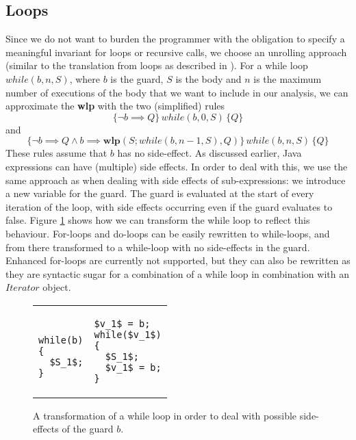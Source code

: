 \documentclass[a4paper, fleqn]{article}
\newcommand{\wlp}{\textbf{wlp}\xspace}
\begin{document}
\subsection{Loops}
Since we do not want to burden the programmer with the obligation to specify a meaningful invariant for loops or recursive calls, we choose an unrolling approach (similar to the translation from loops as described in \cite{guardedcommands}). For a while loop $while(b, n, S)$, where $b$ is the guard, $S$ is the body and $n$ is the maximum number of executions of the body that we want to include in our analysis, we can approximate the \wlp with the two (simplified) rules \[\{\neg b \implies Q\}\,while(b, 0, S)\, \{Q\}\] and \[\{\neg b \implies Q \land b \implies \wlp(S;while(b, n-1, S), Q)\}\,while(b, n, S)\, \{Q\}\] These rules assume that $b$ has no side-effect. As discussed earlier, Java expressions can have (multiple) side effects. In order to deal with this, we use the same approach as when dealing with side effects of sub-expressions: we introduce a new variable for the guard. The guard is evaluated at the start of every iteration of the loop, with side effects occurring even if the guard evaluates to false. Figure \ref{while loop} shows how we can transform the while loop to reflect this behaviour. For-loops and do-loops can be easily rewritten to while-loops, and from there transformed to a while-loop with no side-effects in the guard. Enhanced for-loops are currently not supported, but they can also be rewritten as they are syntactic sugar for a combination of a while loop in combination with an $Iterator$ object.

\begin{figure}[H]
\begin{tabular}{ p{5.5cm} | p{5cm}}
\begin{lstlisting}

while(b)
{
  $S_1$;
}
\end{lstlisting}
&
\begin{lstlisting}
$v_1$ = b;
while($v_1$)
{
  $S_1$;
  $v_1$ = b;
}
\end{lstlisting}
\end{tabular}\caption{A transformation of a while loop in order to deal with possible side-effects of the guard $b$.}
\label{while loop}
\end{figure}
\end{document}
